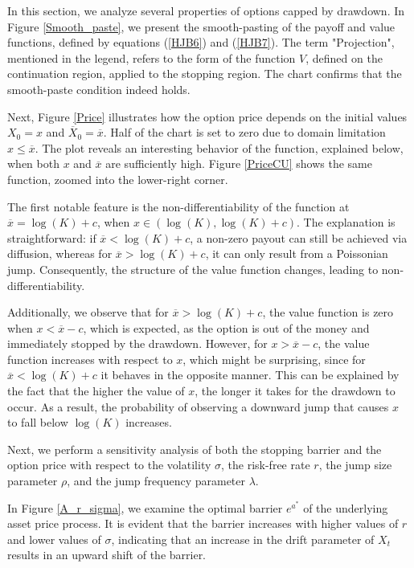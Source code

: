 \documentclass[10pt]{amsart}
\begin{document}
		In this section, we analyze several properties of options capped by drawdown. In Figure \ref{Smooth_paste}, we present the smooth-pasting of the payoff and value functions, defined by equations (\ref{HJB6}) and (\ref{HJB7}). The term "Projection", mentioned in the legend, refers to the form of the function $V$, defined on the continuation region, applied to the stopping region. The chart confirms that the smooth-paste condition indeed holds.
		
		Next, Figure \ref{Price} illustrates how the option price depends on the initial values $X_0 = x$ and $\overline{X}_0 = \overline{x}$. Half of the chart is set to zero due to domain limitation $x \leq \overline{x}$. The plot reveals an interesting behavior of the function, explained below, when both $x$ and $\overline{x}$ are sufficiently high. 
Figure \ref{PriceCU} shows the same function, zoomed into the lower-right corner.
		
		The first notable feature is the non-differentiability of the function at $\overline{x} = \log(K) + c$, when $x \in (\log(K), \log(K) + c)$. The explanation is straightforward: if $\overline{x} < \log(K) + c$, a non-zero payout can still be achieved via diffusion, whereas for $\overline{x} > \log(K) + c$, it can only result from a Poissonian jump. Consequently, the structure of the value function changes, leading to non-differentiability.
		
		Additionally, we observe that for $\overline{x} > \log(K) + c$, the value function is zero when $x < \overline{x} - c$, which is expected, as the option is out of the money and immediately stopped by the drawdown. However, for $x > \overline{x} - c$, the value function increases with respect to $x$, which might be surprising, since for $\overline{x} < \log(K) + c$ it behaves in the opposite manner. This can be explained by the fact that the higher the value of $x$, the longer it takes for the drawdown to occur. As a result, the probability of observing a downward jump that causes $x$ to fall below $\log(K)$ increases.
		
		Next, we perform a sensitivity analysis of both the stopping barrier and the option price with respect to the volatility $\sigma$, the risk-free rate $r$, the jump size parameter $\rho$, and the jump frequency parameter $\lambda$.
		
		In Figure \ref{A_r_sigma}, we examine the optimal barrier $e^{a^*}$ of the underlying asset price process. It is evident that the barrier increases with higher values of $r$ and lower values of $\sigma$, indicating that an increase in the drift parameter of $X_t$ results in an upward shift of the barrier.
		
\end{document}
